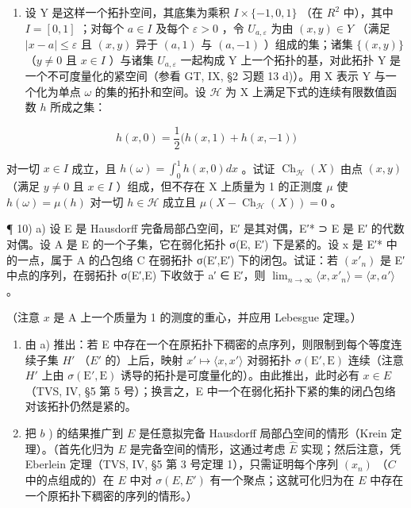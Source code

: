 \begin{enumerate}
\def\labelenumi{\arabic{enumi})}
\setcounter{enumi}{8}
\tightlist
\item
  设 Y 是这样一个拓扑空间，其底集为乘积 \(I \times \{-1,0,1\}\) （在 \(R^{2}\) 中），其中 \(I = [0,1]\) ；对每个 \(a \in I\) 及每个 \(\varepsilon > 0\) ，令 \(U_{a,\varepsilon}\) 为由 \((x,y) \in Y\) （满足 \(|x - a| \leqslant \varepsilon\) 且 \((x,y)\) 异于 \((a,1)\) 与 \((a,-1)\) ）组成的集；诸集 \(\{(x,y)\}\) （\(y \neq 0\) 且 \(x \in I\) ）与诸集 \(U_{a,\varepsilon}\) 一起构成 Y 上一个拓扑的基，对此拓扑 Y 是一个不可度量化的紧空间（参看 GT, IX, §2 习题 13 d)）。用 X 表示 Y 与一个化为单点 \(\omega\) 的集的拓扑和空间。设 \(\mathcal{H}\) 为 X 上满足下式的连续有限数值函数 \(h\) 所成之集：
\end{enumerate}

\[
h (x, 0) = \frac {1}{2} \bigl (h (x, 1) + h (x, - 1) \bigr)
\]

对一切 \(x \in I\) 成立，且 \(h(\omega) = \int_0^1 h(x, 0) dx\) 。试证 \(\operatorname{Ch}_{\mathcal{H}}(X)\) 由点 \((x, y)\) （满足 \(y \neq 0\) 且 \(x \in I\) ）组成，但不存在 X 上质量为 1 的正测度 \(\mu\) 使 \(h(\omega) = \mu(h)\) 对一切 \(h \in \mathcal{H}\) 成立且 \(\mu(X - \operatorname{Ch}_{\mathcal{H}}(X)) = 0\) 。

¶ 10) a) 设 E 是 Hausdorff 完备局部凸空间，E′ 是其对偶，E′* ⊃ E 是 E′ 的代数对偶。设 A 是 E 的一个子集，它在弱化拓扑 σ(E, E′) 下是紧的。设 x 是 E′* 中的一点，属于 A 的凸包络 C 在弱拓扑 σ(E′,E′) 下的闭包。试证：若 \((x'_n)\) 是 E′ 中点的序列，在弱拓扑 σ(E′,E) 下收敛于 a′ ∈ E′，则 \(\lim_{n \to \infty}\langle x, x'_n\rangle = \langle x, a'\rangle\)。

（注意 \(x\) 是 A 上一个质量为 1 的测度的重心，并应用 Lebesgue 定理。）

\begin{enumerate}
\def\labelenumi{\alph{enumi})}
\setcounter{enumi}{1}
\item
  由 a) 推出：若 E 中存在一个在原拓扑下稠密的点序列，则限制到每个等度连续子集 \(H'\) （\(E'\) 的）上后，映射 \(x' \mapsto \langle x, x' \rangle\) 对弱拓扑 \(\sigma(\mathrm{E}', \mathrm{E})\) 连续（注意 \(H'\) 上由 \(\sigma(\mathrm{E}', \mathrm{E})\) 诱导的拓扑是可度量化的）。由此推出，此时必有 \(x \in E\) （TVS, IV, §5 第 5 号）；换言之，E 中一个在弱化拓扑下紧的集的闭凸包络对该拓扑仍然是紧的。
\item
  把 \(b\) ) 的结果推广到 \(E\) 是任意拟完备 Hausdorff 局部凸空间的情形（Krein 定理）。（首先化归为 \(E\) 是完备空间的情形，这通过考虑 \(\widehat{E}\) 实现；然后注意，凭 Eberlein 定理（TVS, IV, §5 第 3 号定理 1），只需证明每个序列 \((x_n)\) （\(C\) 中的点组成的）在 \(E\) 中对 \(\sigma(E, E')\) 有一个聚点；这就可化归为在 \(E\) 中存在一个原拓扑下稠密的序列的情形。）
\end{enumerate}


